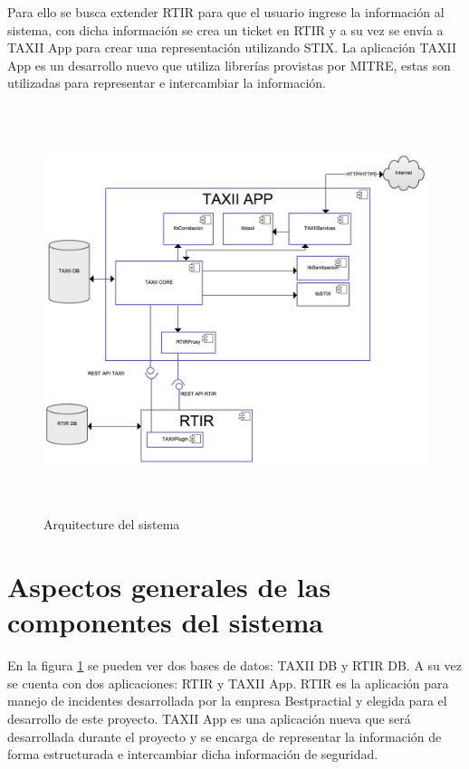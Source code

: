 	\bigskip
	
	Para ello se busca extender RTIR para que el usuario ingrese la información al sistema, con
		dicha información se crea un ticket en RTIR y a su vez se envía a TAXII App para crear una representación utilizando
		STIX. La aplicación TAXII App es un desarrollo nuevo que utiliza librerías provistas por MITRE, estas son utilizadas para representar e intercambiar la información.
	
	
	\bigskip
	
	\begin{figure}[H]
		\centering
		\includegraphics[width=5.7638in,height=4.6846in]{Diseno21-img/Diseno21-img003.png} 
		\caption{Arquitecture del sistema}	
		\label{fig.arquitecturasistema}
	\end{figure}
	\bigskip
	
	
	\section{Aspectos generales de las componentes del sistema}
	
	

	En la figura \ref{fig.arquitecturasistema} se pueden ver dos bases de datos: TAXII DB y RTIR DB. A su vez se cuenta con dos
		aplicaciones: RTIR y TAXII App. RTIR es la aplicación para manejo de incidentes desarrollada por la empresa
		Bestpractial \cite{bp} y elegida para el desarrollo de este proyecto. TAXII App es una aplicación nueva que será
		desarrollada durante el proyecto y se encarga de representar la información de forma estructurada e intercambiar dicha
		información de seguridad.
    \bigskip
	
